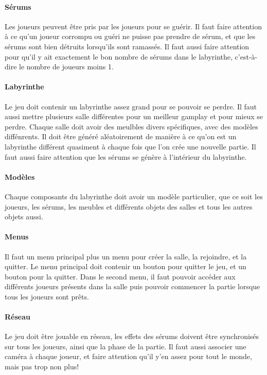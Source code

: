 \documentclass{article}
\begin{document}
\paragraph{Sérums}
Les joueurs peuvent être pris par les joueurs pour se guérir. Il faut faire attention à ce qu'un joueur corrompu ou guéri ne puisse pas prendre de sérum, et que les sérums sont bien détruits lorsqu'ils sont ramassés. Il faut aussi faire attention pour qu'il y ait exactement le bon nombre de sérums dans le labyrinthe, c'est-à-dire le nombre de joueurs moins 1.

\paragraph{Labyrinthe}
Le jeu doit contenir un labyrinthe assez grand pour se pouvoir se perdre. Il faut aussi mettre plusieurs salle différentes pour un meilleur gamplay et pour mieux se perdre. Chaque salle doit avoir des meulbles divers spécifiques, avec des modèles diffénrents. Il doit être généré aléatoirement de manière à ce qu'on est un labyrinthe différent quasiment à chaque fois que l'on crée une nouvelle partie. Il faut aussi faire attention que les sérums se génère à l'intérieur du labyrinthe.

\paragraph{Modèles}
Chaque composants du labyrinthe doit avoir un modèle particulier, que ce soit les joueurs, les sérums, les meubles et différents objets des salles et tous les autres objets aussi.

\paragraph{Menus}
Il faut un menu principal plus un menu pour créer la salle, la rejoindre, et la quitter. Le menu principal doit contenir un bouton pour quitter le jeu, et un bouton pour la quitter. Dans le second menu, il faut pouvoir accéder aux différents joueurs présents dans la salle puis pouvoir commencer la partie lorsque tous les joueurs sont prêts.

\paragraph{Réseau}
Le jeu doit être jouable en réseau, les effets des sérums doivent être synchronisés sur tous les joueurs, ainsi que la phase de la partie. Il faut aussi associer une caméra à chaque joueur, et faire attention qu'il y'en assez pour tout le monde, mais pas trop non plus! 
\end{document}
